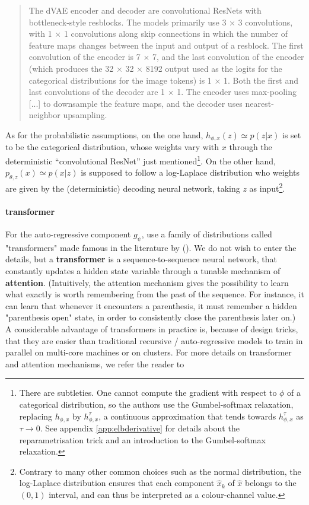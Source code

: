 \documentclass{article}
\begin{document}
\begin{multicols}{2}
\blockquote{The dVAE encoder and decoder are convolutional ResNets with bottleneck-style resblocks. The models primarily use 3 × 3 convolutions, with 1 × 1 convolutions along skip connections in which the number of feature maps changes between the input and output of a resblock. The first convolution of the encoder is 7 × 7, and the last convolution of the encoder (which produces the 32 × 32 × 8192 output used as the logits for the categorical distributions for the image tokens) is 1 × 1. Both the first and last convolutions of the decoder are 1 × 1. The encoder uses max-pooling [...] to downsample the feature maps, and the decoder uses nearest-neighbor upsampling.}

As for the probabilistic assumptions, on the one hand, $h_{\phi,x}(z) \simeq p(z|x)$ is set to be the categorical distribution, whose weights vary with $x$ through the deterministic \enquote{convolutional ResNet} just mentioned\footnote{There are subtleties. One cannot compute the gradient with respect to $\phi$ of a categorical distribution, so the authors use the Gumbel-softmax relaxation, replacing $h_{\phi,x}$ by $h^\tau_{\phi,x}$, a continuous approximation that tends towards $h^\tau_{\phi,x}$ as $\tau \to 0$. See appendix \ref{app:elbderivative} for details about the reparametrisation trick and an introduction to the Gumbel-softmax relaxation.}.
On the other hand, $p_{\theta,z}(x) \simeq p(x|z)$ is supposed to follow a log-Laplace distribution who weights are given by the (deterministic) decoding neural network, taking $z$ as input\footnote{Contrary to many other common choices such as the normal distribution, the log-Laplace distribution ensures that each component $\hat x_k$ of $\hat x$ belongs to the $(0,1)$ interval, and can thus be interpreted as a colour-channel value.}.

\paragraph{\Gls{transformer}}

For the auto-regressive component $g_\psi$, \citeauthor{zeroshot} use a family of distributions called "transformers" made famous in the literature by  (\cite{attneed}). We do not wish to enter the details, but a \textbf{transformer} is a sequence-to-sequence neural network, that constantly updates a hidden state variable through a tunable mechanism of \textbf{attention}. (Intuitively, the attention mechanism gives the possibility to learn what exactly is worth remembering from the past of the sequence. For instance, it can learn that whenever it encounters a parenthesis, it must remember a hidden "parenthesis open" state, in order to consistently close the parenthesis later on.)
A considerable advantage of transformers in practice is, because of design tricks, that they are easier than traditional recursive / auto-regressive models to train in parallel on multi-core machines or on clusters. For more details on \gls{transformer} and attention mechanisms, we refer the reader to \citet{illustransfo, attmechanism, yttransfatt}


\end{multicols}
\end{document}
